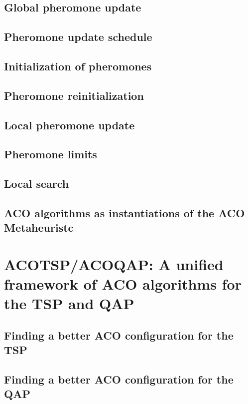 \documentclass[12pt]{article}
\begin{document}
\subsection{Global pheromone update}

\subsection{Pheromone update schedule}

\subsection{Initialization of pheromones}

\subsection{Pheromone reinitialization}

\subsection{Local pheromone update}

\subsection{Pheromone limits}

\subsection{Local search}

\subsection{ACO algorithms as instantiations of the ACO Metaheuristc}

\section{ACOTSP/ACOQAP: A unified framework of ACO algorithms
for the TSP and QAP}

\subsection{Finding a better ACO configuration for the TSP}

\subsection{Finding a better ACO configuration for the QAP}
\end{document}
